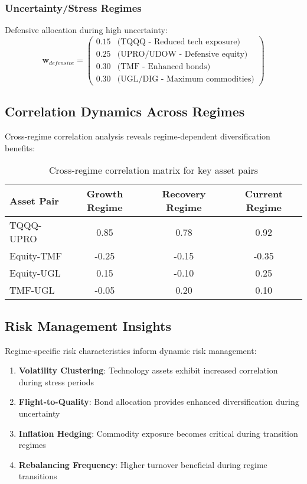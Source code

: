 \documentclass[onecolumn,11pt]{IEEEtran}
\begin{document}
\subsubsection{Uncertainty/Stress Regimes}
Defensive allocation during high uncertainty:
\begin{equation}
\mathbf{w}_{defensive} = \begin{pmatrix}
0.15 & \text{(TQQQ - Reduced tech exposure)} \\
0.25 & \text{(UPRO/UDOW - Defensive equity)} \\
0.30 & \text{(TMF - Enhanced bonds)} \\
0.30 & \text{(UGL/DIG - Maximum commodities)}
\end{pmatrix}
\end{equation}

\subsection{Correlation Dynamics Across Regimes}

Cross-regime correlation analysis reveals regime-dependent diversification benefits:

\begin{table}[h]
\centering
\begin{tabular}{lccc}
\toprule
\textbf{Asset Pair} & \textbf{Growth Regime} & \textbf{Recovery Regime} & \textbf{Current Regime} \\
\midrule
TQQQ-UPRO & 0.85 & 0.78 & 0.92 \\
Equity-TMF & -0.25 & -0.15 & -0.35 \\
Equity-UGL & 0.15 & -0.10 & 0.25 \\
TMF-UGL & -0.05 & 0.20 & 0.10 \\
\bottomrule
\end{tabular}
\caption{Cross-regime correlation matrix for key asset pairs}
\end{table}

\subsection{Risk Management Insights}

Regime-specific risk characteristics inform dynamic risk management:

\begin{enumerate}
    \item \textbf{Volatility Clustering}: Technology assets exhibit increased correlation during stress periods
    \item \textbf{Flight-to-Quality}: Bond allocation provides enhanced diversification during uncertainty
    \item \textbf{Inflation Hedging}: Commodity exposure becomes critical during transition regimes
    \item \textbf{Rebalancing Frequency}: Higher turnover beneficial during regime transitions
\end{enumerate}
\end{document}
